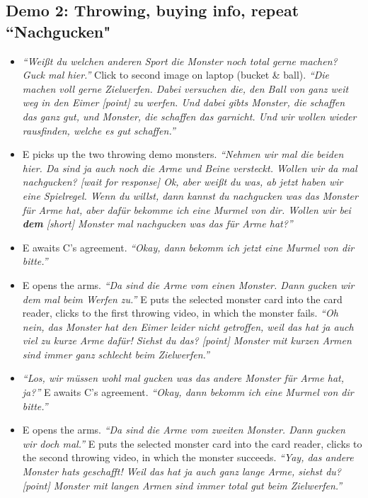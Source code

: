 \documentclass{article}
\begin{document}
\subsection{Demo 2: Throwing, buying info, repeat ``Nachgucken"}\label{demo-2-throwing-buying-info-repeat-nachgucken}

\begin{itemize}
\item
  \emph{``Weißt du welchen anderen Sport die Monster noch total gerne machen? Guck mal hier.''} Click to second image on laptop (bucket \& ball). \emph{``Die machen voll gerne Zielwerfen. Dabei versuchen die, den Ball von ganz weit weg in den Eimer {[}point{]} zu werfen. Und dabei gibts Monster, die schaffen das ganz gut, und Monster, die schaffen das garnicht. Und wir wollen wieder rausfinden, welche es gut schaffen.''}
\item
  E picks up the two throwing demo monsters. \emph{``Nehmen wir mal die beiden hier. Da sind ja auch noch die Arme und Beine versteckt. Wollen wir da mal nachgucken? {[}wait for response{]} Ok, aber weißt du was, ab jetzt haben wir eine Spielregel. Wenn du willst, dann kannst du nachgucken was das Monster für Arme hat, aber dafür bekomme ich eine Murmel von dir. Wollen wir bei \textbf{dem} {[}short{]} Monster mal nachgucken was das für Arme hat?''}
\item
  E awaits C's agreement. \emph{``Okay, dann bekomm ich jetzt eine Murmel von dir bitte.''}
\item
  E opens the arms. \emph{``Da sind die Arme vom einen Monster. Dann gucken wir dem mal beim Werfen zu.''} E puts the selected monster card into the card reader, clicks to the first throwing video, in which the monster fails. \emph{``Oh nein, das Monster hat den Eimer leider nicht getroffen, weil das hat ja auch viel zu kurze Arme dafür! Siehst du das? {[}point{]} Monster mit kurzen Armen sind immer ganz schlecht beim Zielwerfen.''}
\item
  \emph{``Los, wir müssen wohl mal gucken was das andere Monster für Arme hat, ja?''} E awaits C's agreement. \emph{``Okay, dann bekomm ich eine Murmel von dir bitte.''}
\item
  E opens the arms. \emph{``Da sind die Arme vom zweiten Monster. Dann gucken wir doch mal.''} E puts the selected monster card into the card reader, clicks to the second throwing video, in which the monster succeeds. \emph{``Yay, das andere Monster hats geschafft! Weil das hat ja auch ganz lange Arme, siehst du? {[}point{]} Monster mit langen Armen sind immer total gut beim Zielwerfen.''}

\end{itemize}
\end{document}
